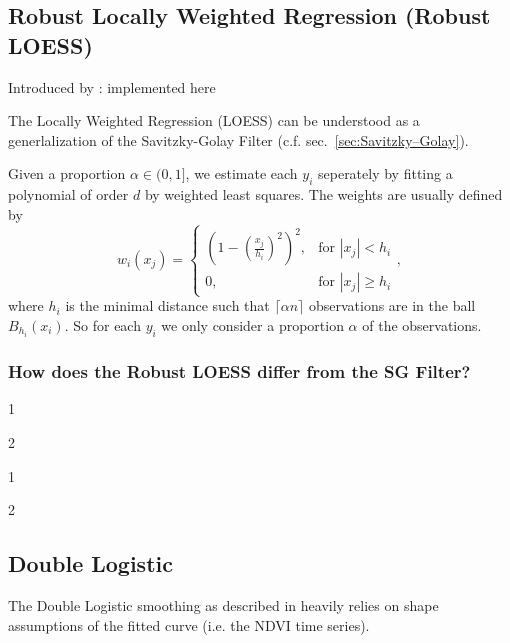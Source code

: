 \subsection{Robust Locally Weighted Regression (Robust LOESS)}
\label{sec:loess}
Introduced by : \cite{clevelandRobustLocallyWeighted1979}
implemented here \cite{cappellariATLAS3DProjectXX2013}

The Locally Weighted Regression (LOESS) can be understood as a generlalization of the Savitzky-Golay Filter (c.f. sec.~\ref{sec:Savitzky–Golay}).

Given a proportion $\alpha \in (0,1]$, we estimate each $y_i$ seperately by fitting a polynomial of order $d$ by weighted least squares. The weights are usually defined by
$$w_i(x_j)=\begin{cases}
    \left(1-\left(\frac{x_j}{h_i}\right)^{2}\right)^{2}, & \text{for } |x_j|<h_i           \\
    0,                                                   & \text{for } |x_j| \geqslant h_i
  \end{cases} ,$$
where $h_i$ is the minimal distance such that $\lceil \alpha n\rceil$ observations are in the ball $B_{h_i}(x_i)$. So for each $y_i$ we only consider a proportion $\alpha$ of the observations.

\subsubsection{How does the Robust LOESS differ from the SG Filter?}


\begin{my_pros_cons_table}{
    \item 1
    \item 2
  }{
    \item 1
    \item 2
  }
\end{my_pros_cons_table}

\subsubsection{}

\subsection{Double Logistic}
\label{sec:double_logistic}
The Double Logistic smoothing as described in \cite{beckImprovedMonitoringVegetation2006} heavily relies on shape assumptions of the fitted curve (i.e. the NDVI time series).

